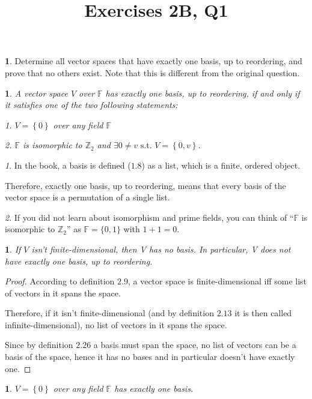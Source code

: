 \documentclass[english]{article}
\theoremstyle{definition}
\newtheorem*{xca*}{\protect\exercisename}
\theoremstyle{plain}
\newtheorem*{thm*}{\protect\theoremname}
\theoremstyle{remark}
\newtheorem*{rem*}{\protect\remarkname}
\theoremstyle{plain}
\theoremstyle{plain}
\newtheorem{lem}[thm]{\protect\lemmaname}
\providecommand{\exercisename}{Exercise}
\providecommand{\lemmaname}{Lemma}
\providecommand{\remarkname}{Remark}
\providecommand{\theoremname}{Theorem}
\begin{document}
\title{{\Large\vspace{-2em}Exercises 2B, Q1\vspace{-2em}}}
\maketitle
\begin{xca*}
Determine all vector spaces that have exactly one basis, up to reordering,
and prove that no others exist. Note that this is different from the
original question. 
\end{xca*}
\begin{thm*}
A vector space $V$ over $\mathbb{F}$ has exactly one basis, up to
reordering, if and only if it satisfies one of the two following statements:

1. $V=\left\{ 0\right\} $ over any field $\mathbb{F}$

2. $\mathbb{F}$ is isomorphic to $\mathbb{Z}_{2}$ and $\exists0\ne v\text{ s.t. }V=\left\{ 0,v\right\} $.
\end{thm*}
\begin{rem*}
In the book, a basis is defined ($1.8$) as a list, which is a finite,
ordered object. 

Therefore, exactly one basis, up to reordering, means that every basis
of the vector space is a permutation of a single list.
\end{rem*}
\begin{rem*}
If you did not learn about isomorphism and prime fields, you can think
of ``$\mathbb{F}$ is isomorphic to $\mathbb{Z}_{2}$'' as $\mathbb{F}=\{0,1\}$
with $1+1=0$.
\end{rem*}
\begin{lem}
If $V$ isn't finite-dimensional, then V has no basis. In particular,
V does not have exactly one basis, up to reordering.
\end{lem}

\begin{proof}
According to definition $2.9$, a vector space is finite-dimensional
iff some list of vectors in it spans the space. 

Therefore, if it isn't finite-dimensional (and by definition $2.13$
it is then called infinite-dimensional), no list of vectors in it
spans the space.

Since by definition $2.26$ a basis must span the space, no list of
vectors can be a basis of the space, hence it has no bases and in
particular doesn't have exactly one. 
\end{proof}
\begin{lem}
$V=\left\{ 0\right\} $ over any field $\mathbb{F}$ has exactly one
basis.
\end{lem}
\end{document}
